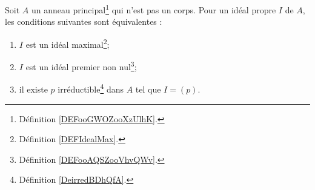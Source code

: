 \begin{proposition} \label{PropomqcGe}
	Soit \( A\) un anneau principal\footnote{Définition \ref{DEFooGWOZooXzUlhK}.} qui n'est pas un corps. Pour un idéal propre \( I\) de \( A\), les conditions suivantes sont équivalentes :
	\begin{enumerate}
		\item       \label{ITEMooNOVFooEHtcwE}
		      \( I\) est un idéal maximal\footnote{Définition \ref{DEFIdealMax}.};
		\item       \label{ITEMooMQWVooNocVEU}
		      \( I\) est un idéal premier non nul\footnote{Définition \ref{DEFooAQSZooVhvQWv}.};
		\item       \label{ITEMooJBXGooEISNuW}
		      il existe \( p\) irréductible\footnote{Définition \ref{DeirredBDhQfA}.} dans \( A\) tel que \( I=(p)\).
	\end{enumerate}
\end{proposition}

